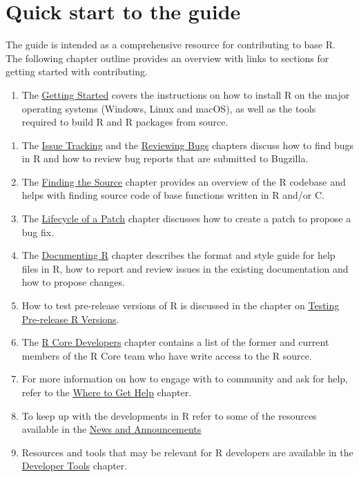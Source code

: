 \documentclass[
]{book}
\providecommand{\tightlist}{%
  \setlength{\itemsep}{0pt}\setlength{\parskip}{0pt}}
\begin{document}
\section{Quick start to the guide}\label{quick-start-to-the-guide}

The guide is intended as a comprehensive resource for contributing to base R. The following chapter outline provides an overview with links to sections for getting started with contributing.

\begin{enumerate}
\def\labelenumi{\arabic{enumi}.}
\tightlist
\item
  The \hyperref[GetStart]{Getting Started} covers the instructions on how to install R on the major operating systems (Windows, Linux and macOS), as well as the tools required to build R and R packages from source.
\end{enumerate}

\begin{enumerate}
\def\labelenumi{\arabic{enumi}.}
\setcounter{enumi}{1}
\item
  The \hyperref[IssueTrack]{Issue Tracking} and the \hyperref[ReviewBugs]{Reviewing Bugs} chapters discuss how to find bugs in R and how to review bug reports that are submitted to Bugzilla.
\item
  The \hyperref[FindSource]{Finding the Source} chapter provides an overview of the R codebase and helps with finding source code of base functions written in R and/or C.
\item
  The \hyperref[FixBug]{Lifecycle of a Patch} chapter discusses how to create a patch to propose a bug fix.
\item
  The \hyperref[Doc]{Documenting R} chapter describes the format and style guide for help files in R, how to report and review issues in the existing documentation and how to propose changes.
\item
  How to test pre-release versions of R is discussed in the chapter on \hyperref[TestRVer]{Testing Pre-release R Versions}.
\item
  The \hyperref[CoreDev]{R Core Developers} chapter contains a list of the former and current members of the R Core team who have write access to the R source.
\item
  For more information on how to engage with to community and ask for help, refer to the \hyperref[WhereToGetHelp]{Where to Get Help} chapter.
\item
  To keep up with the developments in R refer to some of the resources available in the \hyperref[News]{News and Announcements}
\item
  Resources and tools that may be relevant for R developers are available in the \hyperref[DevTools]{Developer Tools} chapter.
\end{enumerate}
\end{document}
